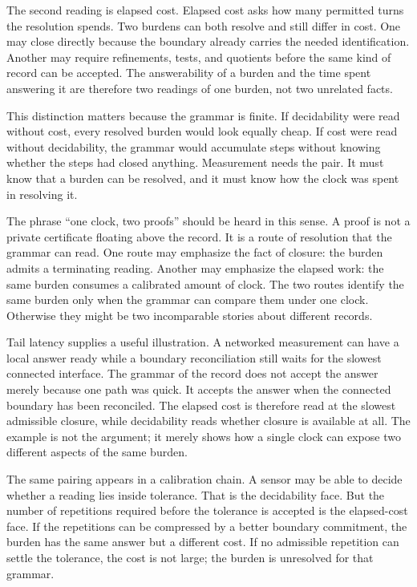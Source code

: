 The second reading is elapsed cost. Elapsed cost asks how many permitted
turns the resolution spends. Two burdens can both resolve and still differ
in cost. One may close directly because the boundary already carries the
needed identification. Another may require refinements, tests, and
quotients before the same kind of record can be accepted. The answerability
of a burden and the time spent answering it are therefore two readings of one
burden, not two unrelated facts.

This distinction matters because the grammar is finite. If decidability were
read without cost, every resolved burden would look equally cheap. If cost
were read without decidability, the grammar would accumulate steps without
knowing whether the steps had closed anything. Measurement needs the pair.
It must know that a burden can be resolved, and it must know how the clock
was spent in resolving it.

The phrase ``one clock, two proofs'' should be heard in this sense. A proof
is not a private certificate floating above the record. It is a route of
resolution that the grammar can read. One route may emphasize the fact of
closure: the burden admits a terminating reading. Another may emphasize the
elapsed work: the same burden consumes a calibrated amount of clock. The two
routes identify the same burden only when the grammar can compare them under
one clock. Otherwise they might be two incomparable stories about different
records.

Tail latency supplies a useful illustration. A networked measurement can
have a local answer ready while a boundary reconciliation still waits for
the slowest connected interface. The grammar of the record does not accept
the answer merely because one path was quick. It accepts the answer when the
connected boundary has been reconciled. The elapsed cost is therefore read
at the slowest admissible closure, while decidability reads whether closure
is available at all. The example is not the argument; it merely shows how a
single clock can expose two different aspects of the same burden.

The same pairing appears in a calibration chain. A sensor may be able to
decide whether a reading lies inside tolerance. That is the decidability
face. But the number of repetitions required before the tolerance is
accepted is the elapsed-cost face. If the repetitions can be compressed by a
better boundary commitment, the burden has the same answer but a different
cost. If no admissible repetition can settle the tolerance, the cost is not
large; the burden is unresolved for that grammar.

